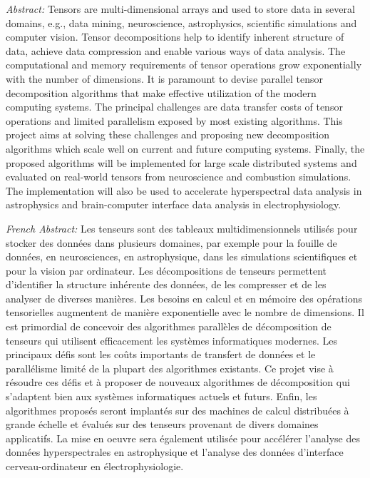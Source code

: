 \documentclass[a4paper,11pt]{article}
\begin{document}
\emph{Abstract:}
%
Tensors are multi-dimensional arrays and used to store data in several domains, e.g., data mining, neuroscience, astrophysics, scientific simulations and computer vision. Tensor decompositions help to identify inherent structure of data, achieve data compression and enable various ways of data analysis. The computational and memory requirements of tensor operations grow exponentially with the number of dimensions. It is paramount to devise parallel tensor decomposition algorithms that make effective utilization of the modern computing systems. The principal challenges are data transfer costs of tensor operations and limited parallelism exposed by most existing algorithms. This project aims at solving these challenges and proposing new decomposition algorithms which scale well on current and future computing systems. Finally, the proposed algorithms will be implemented for large scale distributed systems and evaluated on real-world tensors from neuroscience and combustion simulations. The implementation will also be used to accelerate hyperspectral data analysis in astrophysics and brain-computer interface data analysis in electrophysiology.


\emph{French Abstract:}
Les tenseurs sont des tableaux multidimensionnels utilisés pour stocker des données dans plusieurs domaines, par exemple pour la fouille de données, en neurosciences, en astrophysique, dans les simulations scientifiques et pour la vision par ordinateur. Les décompositions de tenseurs permettent d'identifier la structure inhérente des données, de les compresser et de les analyser de diverses manières. Les besoins en calcul et en mémoire des opérations tensorielles augmentent de manière exponentielle avec le nombre de dimensions. Il est primordial de concevoir des algorithmes parallèles de décomposition de tenseurs qui utilisent efficacement les systèmes informatiques modernes.  Les principaux défis sont les coûts importants de transfert de données et le parallélisme limité de la plupart des algorithmes existants.  Ce projet vise à résoudre ces défis et à proposer de nouveaux algorithmes de décomposition qui s'adaptent bien aux systèmes informatiques actuels et futurs. Enfin, les algorithmes proposés seront implantés sur des machines de calcul distribuées à grande échelle et évalués sur des tenseurs provenant de divers domaines applicatifs. La mise en oeuvre sera également utilisée pour accélérer l'analyse des données hyperspectrales en astrophysique et l'analyse des données d'interface cerveau-ordinateur en électrophysiologie.
\end{document}

